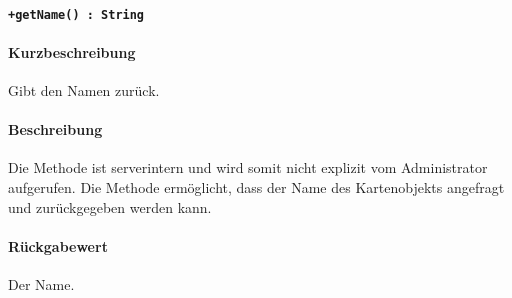 \paragraph*{\texttt{+getName() : String}}%
\paragraph*{Kurzbeschreibung}
Gibt den Namen zurück.
\paragraph*{Beschreibung}
Die Methode ist serverintern und wird somit nicht explizit vom Administrator aufgerufen.
Die Methode ermöglicht, dass der Name des Kartenobjekts angefragt und zurückgegeben werden kann.
\paragraph*{Rückgabewert}
Der Name.
